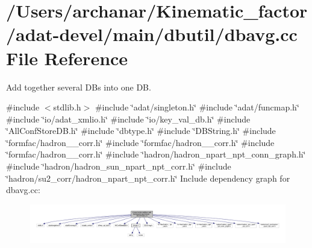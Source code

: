 \hypertarget{adat-devel_2main_2dbutil_2dbavg_8cc}{}\section{/\+Users/archanar/\+Kinematic\+\_\+factor/adat-\/devel/main/dbutil/dbavg.cc File Reference}
\label{adat-devel_2main_2dbutil_2dbavg_8cc}


Add together several DB\textquotesingle{}s into one DB.  


{\ttfamily \#include $<$stdlib.\+h$>$}\newline
{\ttfamily \#include \char`\"{}adat/singleton.\+h\char`\"{}}\newline
{\ttfamily \#include \char`\"{}adat/funcmap.\+h\char`\"{}}\newline
{\ttfamily \#include \char`\"{}io/adat\+\_\+xmlio.\+h\char`\"{}}\newline
{\ttfamily \#include \char`\"{}io/key\+\_\+val\+\_\+db.\+h\char`\"{}}\newline
{\ttfamily \#include \char`\"{}All\+Conf\+Store\+D\+B.\+h\char`\"{}}\newline
{\ttfamily \#include \char`\"{}dbtype.\+h\char`\"{}}\newline
{\ttfamily \#include \char`\"{}D\+B\+String.\+h\char`\"{}}\newline
{\ttfamily \#include \char`\"{}formfac/hadron\+\_\+1pt\+\_\+corr.\+h\char`\"{}}\newline
{\ttfamily \#include \char`\"{}formfac/hadron\+\_\+2pt\+\_\+corr.\+h\char`\"{}}\newline
{\ttfamily \#include \char`\"{}formfac/hadron\+\_\+3pt\+\_\+corr.\+h\char`\"{}}\newline
{\ttfamily \#include \char`\"{}hadron/hadron\+\_\+npart\+\_\+npt\+\_\+conn\+\_\+graph.\+h\char`\"{}}\newline
{\ttfamily \#include \char`\"{}hadron/hadron\+\_\+sun\+\_\+npart\+\_\+npt\+\_\+corr.\+h\char`\"{}}\newline
{\ttfamily \#include \char`\"{}hadron/su2\+\_\+corr/hadron\+\_\+npart\+\_\+npt\+\_\+corr.\+h\char`\"{}}\newline
Include dependency graph for dbavg.\+cc\+:
\nopagebreak
\begin{figure}[H]
\begin{center}
\leavevmode
\includegraphics[width=350pt]{d1/dcc/adat-devel_2main_2dbutil_2dbavg_8cc__incl}
\end{center}
\end{figure}
